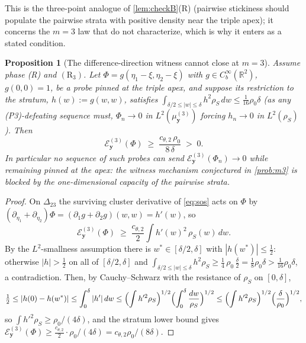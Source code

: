 \documentclass[reqno,final,11pt]{amsart}
\theoremstyle{plain}
\newtheorem{proposition}[theorem]{Proposition}
\theoremstyle{definition}
\theoremstyle{remark}
\newcommand{\R}{\mathbb R}
\newcommand{\cE}{\mathcal E}
\begin{document}
This is the three-point analogue of \cref{lem:checkB}\textnormal{(R)}
(pairwise stickiness should populate the pairwise strata with positive density
near the triple apex); it concerns the $m=3$ law that \citep{LJR-FCN,LJR-circle-noise}
do not characterize, which is why it enters as a stated condition.

\begin{proposition}[The difference-direction witness cannot close at $m=3$]\label{prop:m3-blocked}
Assume phase \textnormal{(R)} and $(\mathrm R_3)$. Let
$\Phi=g(\eta_1-\xi,\eta_2-\xi)$ with $g\in C_b^\infty(\R^2)$, $g(0,0)=1$, be a
probe pinned at the triple apex, and suppose its restriction to the stratum,
$h(w):=g(w,w)$, satisfies $\int_{\delta/2\le|w|\le\delta}h^2\rho_S\,dw\le
\tfrac{1}{16}\rho_0\delta$ (as any \textnormal{(P3)}-defeating sequence must,
$\Phi_n\to0$ in $L^2(\mu^{(3)}_{\mathbf y})$ forcing $h_n\to0$ in
$L^2(\rho_S)$). Then
\[
  \cE^{(3)}_{\mathbf y}(\Phi)\;\ge\;\frac{c_{\theta,2}\,\rho_0}{8\,\delta}\;>\;0 .
\]
In particular no sequence of such probes can send
$\cE^{(3)}_{\mathbf y}(\Phi_n)\to0$ while remaining pinned at the apex: the
witness mechanism conjectured in \cref{prob:m3} is blocked by the
one-dimensional capacity of the pairwise strata.
\end{proposition}
\begin{proof}
On $\Delta_{23}$ the surviving cluster derivative of \eqref{eq:sos} acts on
$\Phi$ by $(\partial_{\eta_1}+\partial_{\eta_2})\Phi=
(\partial_1g+\partial_2g)(w,w)=h'(w)$, so
\[
  \cE^{(3)}_{\mathbf y}(\Phi)\;\ge\;\frac{c_{\theta,2}}2
  \int h'(w)^2\,\rho_S(w)\,dw .
\]
By the $L^2$-smallness assumption there is $w^*\in[\delta/2,\delta]$ with
$|h(w^*)|\le\tfrac12$: otherwise $|h|>\tfrac12$ on all of $[\delta/2,\delta]$
and $\int_{\delta/2\le|w|\le\delta}h^2\rho_S\ge\tfrac14\,\rho_0\,\tfrac\delta2
=\tfrac18\rho_0\delta>\tfrac1{16}\rho_0\delta$, a contradiction. Then, by
Cauchy--Schwarz with the resistance of $\rho_S$ on $[0,\delta]$,
\[
  \tfrac12\le|h(0)-h(w^*)|\le\int_0^{\delta}|h'|\,dw
  \le\Bigl(\int h'^2\rho_S\Bigr)^{1/2}\Bigl(\int_0^{\delta}\frac{dw}{\rho_S}\Bigr)^{1/2}
  \le\Bigl(\int h'^2\rho_S\Bigr)^{1/2}\Bigl(\frac{\delta}{\rho_0}\Bigr)^{1/2},
\]
so $\int h'^2\rho_S\ge\rho_0/(4\delta)$, and the stratum lower bound gives
$\cE^{(3)}_{\mathbf y}(\Phi)\ge\tfrac{c_{\theta,2}}2\cdot\rho_0/(4\delta)
=c_{\theta,2}\rho_0/(8\delta)$.
\end{proof}



\end{document}
